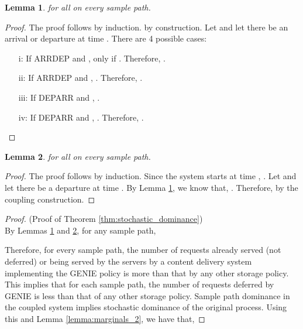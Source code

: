 \documentclass[10pt, conference, letterpaper]{IEEEtran}
\newtheorem{lemma}{Lemma}
\begin{document}
\begin{lemma}
	\label{lemma:x_stochastic_dominance_y}
	 for all  on every sample path.
\end{lemma}
\begin{proof} 
	The proof follows by induction.  by construction.
	Let  and let there be an arrival or departure at time . There are 4 possible cases:
	\begin{itemize}
		\item[i:] If ARRDEP and ,  only if . Therefore, .
		\item[ii:] If ARRDEP and , . Therefore, .
		\item[iii:] If DEPARR and , .
		\item[iv:] If DEPARR and , . Therefore, .
	\end{itemize}
\end{proof}

\begin{lemma}
	\label{lemma:departures_stochastic_dominance}
	 for all  on every sample path.
\end{lemma}
\begin{proof}
	The proof follows by induction. Since the system starts at time , . Let  and let there be a departure at time . By Lemma \ref{lemma:x_stochastic_dominance_y}, we know that, . Therefore,  by the coupling construction.
\end{proof}



\begin{proof} (Proof of Theorem \ref{thm:stochastic_dominance}) \\
	By Lemmas \ref{lemma:x_stochastic_dominance_y} and \ref{lemma:departures_stochastic_dominance}, for any sample path,
	
	Therefore, for every sample path, the number of requests already served (not deferred) or being served by the servers by a content delivery system implementing the GENIE policy is more than that by any other storage policy. This implies that for each sample path, the number of requests deferred by GENIE is less than that of any other storage policy. Sample path dominance in the coupled system implies stochastic dominance of the original process. Using this and Lemma \ref{lemma:marginals_2}, we have that,
	
\end{proof}
\end{document}
